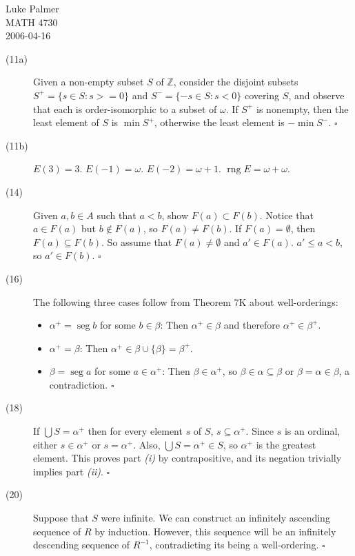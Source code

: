 \documentclass[12pt]{article}
\newcommand{\qed}{\hfill $\square$}
\DeclareMathOperator{\rng}{rng}
\DeclareMathOperator{\seg}{seg}
\begin{document}
\noindent 
Luke Palmer \\
MATH 4730 \\
2006-04-16

\begin{description}
\item [(11a)] Given a non-empty subset $S$ of $\mathbb{Z}$, consider the
disjoint subsets $S^+ = \{ s \in S: s >= 0 \}$ and $S^- = \{ -s \in S: s
< 0 \}$ covering $S$, and observe that each is order-isomorphic to a
subset of $\omega$.  If $S^+$ is nonempty, then the least element of $S$
is $\min S^+$, otherwise the least element is $-\min S^-$. \qed

\item [(11b)] $E(3) = 3$.  $E(-1) = \omega$.  $E(-2) = \omega+1$.
$\rng E = \omega + \omega$.

\item [(14)] Given $a,b \in A$ such that $a < b$, show $F(a) \subset
F(b)$.  Notice that $a \in F(a)$ but $b \not\in F(a)$, so $F(a) \not=
F(b)$.  If $F(a) = \emptyset$, then $F(a) \subseteq F(b)$.  So assume
that $F(a) \not= \emptyset$ and $a' \in F(a)$.  $a' \leq a < b$, so
$a' \in F(b)$. \qed

\item [(16)] The following three cases follow from Theorem 7K about
well-orderings:
 \begin{itemize}
 \item $\alpha^+ = \seg b$ for some $b \in \beta$: Then $\alpha^+ \in
   \beta$ and therefore $\alpha^+ \in \beta^+$.
 \item $\alpha^+ = \beta$: Then $\alpha^+ \in \beta \cup \{\beta\} =
   \beta^+$.
 \item $\beta = \seg a$ for some $a \in \alpha^+$:  Then $\beta \in
   \alpha^+$, so $\beta \in \alpha \subseteq \beta$ or $\beta = \alpha
   \in \beta$, a contradiction. \qed
 \end{itemize}

\item [(18)] If $\bigcup S =
\alpha^+$ then for every element $s$ of $S$, $s \subseteq \alpha^+$.
Since $s$ is an ordinal, either $s \in \alpha^+$ or $s = \alpha^+$.
Also, $\bigcup S = \alpha^+ \in S$, so $\alpha^+$ is the greatest
element.  This proves part \textit{(i)} by contrapositive, and its
negation trivially implies part \textit{(ii)}.  \qed

\item [(20)] Suppose that $S$ were infinite.  We can construct an infinitely
ascending sequence of $R$ by induction.  However, this sequence will
be an infinitely descending sequence of $R^{-1}$, contradicting its
being a well-ordering. \qed
\end{description}
\end{document}
